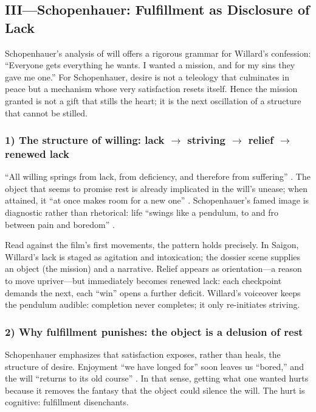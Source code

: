 \subsection*{III—Schopenhauer: Fulfillment as Disclosure of Lack}
\label{ssec:iii-schopenhauer}
Schopenhauer's analysis of will offers a rigorous grammar for Willard's confession:
``Everyone gets everything he wants. I wanted a mission, and for my sins they gave me one.''
For Schopenhauer, desire is not a teleology that culminates in peace but a mechanism whose
very satisfaction resets itself. Hence the mission granted is not a gift that stills the heart;
it is the next oscillation of a structure that cannot be stilled.

\subsubsection*{1) The structure of willing: lack $\rightarrow$ striving
	$\rightarrow$ relief $\rightarrow$ renewed lack}

``All willing springs from lack, from deficiency, and therefore from suffering''
\parencite[p.~196]{SchopenhauerWWR1969}. The object that seems to promise rest is already
implicated in the will's unease; when attained, it ``at once makes room for a new one''
\parencite[p.~319]{SchopenhauerWWR1969}. Schopenhauer's famed image is diagnostic rather
than rhetorical: life ``swings like a pendulum, to and fro between pain and boredom''
\parencite[p.~312]{SchopenhauerWWR1969}.

Read against the film's first movements, the pattern holds precisely. In Saigon, Willard's
lack is staged as agitation and intoxication; the dossier scene supplies an object (the mission)
and a narrative. Relief appears as orientation—a reason to move upriver—but immediately becomes
renewed lack: each checkpoint demands the next, each ``win'' opens a further deficit.
Willard's voiceover keeps the pendulum audible: completion never completes; it only
re-initiates striving.

\subsubsection*{2) Why fulfillment punishes: the object is a delusion of rest}

Schopenhauer emphasizes that satisfaction exposes, rather than heals, the structure of desire.
Enjoyment ``we have longed for'' soon leaves us ``bored,'' and the will ``returns to its old
course'' \parencite[p.~319]{SchopenhauerWWR1969}. In that sense, getting what one wanted hurts
because it removes the fantasy that the object could silence the will. The hurt is cognitive:
fulfillment disenchants.


